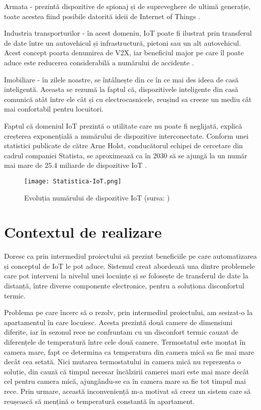 	Armata - prezintă dispozitive de spionaj și de supreveghere de ultimă generație, toate acestea fiind posibile datorită ideii de Internet of Things \cite{army}.

	Industria transporturilor - în acest domeniu, IoT poate fi ilustrat prin transferul de date între un autovehicul și infrastructură, pietoni sau un alt autovehicul. Acest concept poarta denumirea de V2X, iar beneficiul major pe care îl poate aduce este reducerea considerabilă a numărului de accidente \cite{V2X}.   

	Imobiliare - în zilele noastre, se întâlnește din ce în ce mai des ideea de casă inteligentă. Aceasta se rezumă la faptul că, dispozitivele inteligente din casă comunică atât între ele cât și cu electrocasnicele, reușind sa creeze un mediu cât mai confortabil pentru locuitori.

	Faptul că domeniul IoT prezintă o utilitate care nu poate fi neglijată, explică creșterea exponențială a numărului de dispozitive interconectate. Conform unei statistici publicate de către Arne Holst, conducătorul echipei de cercetare din cadrul companiei Statista, se aproximează ca în 2030 să se ajungă la un număr mai mare de 25.4 miliarde de dispozitive IoT \cite{increaseOfIot}.

\bigskip

\begin{figure}[H]
   	\centering
    	\texttt{[image: Statistica-IoT.png]}
	\caption{Evoluția numărului de dispozitive IoT (sursa: \cite{increaseOfIot})}
\end{figure}

\section{Contextul de realizare}\label{sec:context}
	Doresc ca prin intermediul proiectului să prezint beneficiile pe care automatizarea și conceptul de IoT le pot aduce. Sistemul creat abordează una dintre problemele care pot interveni la nivelul unei locuințe și se folosește de transferul de date la distanță, între diverse componente electronice, pentru a soluționa disconfortul termic.

	Problema pe care încerc să o rezolv, prin intermediul proiectului, am sesizat-o la apartamentul în care locuiesc. Acesta prezintă două camere de dimensiuni diferite, iar în sezonul rece ne confruntam cu un disconfort termic cauzat de diferențele de temperatură între cele două camere. Termostatul este montat în camera mare, fapt ce determina ca temperatura din camera mică sa fie mai mare decât cea setată. Nici mutarea termostatului in camera mică nu reprezenta o soluție, din cauză că timpul necesar încălzirii camerei mari este mai mare decât cel pentru camera mică, ajungându-se ca în camera mare sa fie tot timpul mai rece. Prin urmare, această inconveniență m-a motivat să creez un sistem care să reușească să mențină o temperatură constantă în apartament.

